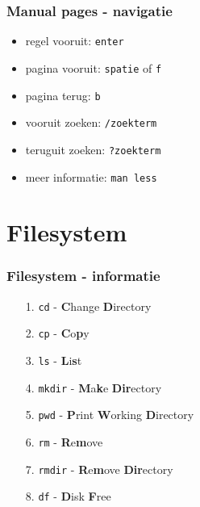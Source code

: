 \documentclass{beamer}
\begin{document}
\begin{frame}
  \frametitle{Manual pages - navigatie}
  \begin{itemize}
  \item<1-> regel vooruit: \texttt{enter}
  \item<1-> pagina vooruit: \texttt{spatie} of \texttt{f}
  \item<1-> pagina terug: \texttt{b}
  \item<1-> vooruit zoeken: \texttt{/zoekterm}
  \item<1-> teruguit zoeken: \texttt{?zoekterm}
  \item<2-> meer informatie: \texttt{man less}
  \end{itemize}
\end{frame}

\section{Filesystem}

\begin{frame}
  \frametitle{Filesystem - informatie}
  \begin{itemize}
  \item[1.] \texttt{cd} - \textbf{C}hange \textbf{D}irectory
  \item[2.] \texttt{cp} - \textbf{C}o\textbf{p}y
  \item[3.] \texttt{ls} - \textbf{L}i\textbf{s}t
  \item[4.] \texttt{mkdir} - \textbf{M}a\textbf{k}e \textbf{Dir}ectory
  \item[5.] \texttt{pwd} - \textbf{P}rint \textbf{W}orking \textbf{D}irectory
  \item[6.] \texttt{rm} - \textbf{R}e\textbf{m}ove
  \item[7.] \texttt{rmdir} - \textbf{R}e\textbf{m}ove \textbf{Dir}ectory
  \item[8.] \texttt{df} - \textbf{D}isk \textbf{F}ree
  \end{itemize}
\end{frame}
\end{document}
